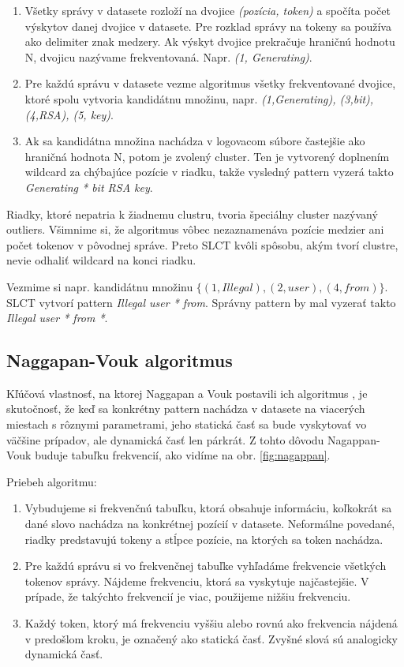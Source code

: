 \begin{enumerate}
  \item Všetky správy v datasete rozloží na dvojice \emph{(pozícia, token)} a spočíta počet výskytov danej dvojice v datasete. Pre rozklad správy na tokeny sa používa ako delimiter znak medzery. Ak výskyt dvojice prekračuje hraničnú hodnotu N, dvojicu nazývame frekventovaná. Napr. \emph{(1, Generating)}.
  \item Pre každú správu v datasete vezme algoritmus všetky frekventované dvojice, ktoré spolu vytvoria kandidátnu množinu, napr. \emph{{(1,Generating), (3,bit), (4,RSA), (5, key)}}. 
  \item Ak sa kandidátna množina nachádza v logovacom súbore častejšie ako hraničná hodnota N, potom je zvolený cluster. Ten je vytvorený doplnením wildcard za chýbajúce pozície v riadku, takže vysledný pattern vyzerá takto \emph{Generating * bit RSA key}.
\end{enumerate}

Riadky, ktoré nepatria k žiadnemu clustru, tvoria špeciálny cluster nazývaný outliers. Všimnime si, že algoritmus vôbec nezaznamenáva pozície medzier ani počet tokenov v pôvodnej správe. Preto SLCT kvôli spôsobu, akým tvorí clustre, nevie odhaliť wildcard na konci riadku. 
\par Vezmime si napr. kandidátnu množinu $\{(1,Illegal), (2,user), (4,from)\} $. SLCT vytvorí pattern \emph{Illegal user * from}. Správny pattern by mal vyzerať takto  \emph{Illegal user * from *}.

\subsection{Naggapan-Vouk algoritmus}
Kľúčová vlastnosť, na ktorej Naggapan a Vouk postavili ich algoritmus \parencite{nagappanvouk}, je skutočnosť, že keď sa konkrétny pattern nachádza v datasete na viacerých miestach s rôznymi parametrami, jeho statická časť sa bude vyskytovať vo väčšine prípadov, ale dynamická časť len párkrát. Z tohto dôvodu Nagappan-Vouk buduje tabuľku frekvencií, ako vidíme na obr. \ref{fig:nagappan}. 
\par Priebeh algoritmu:

\begin{enumerate}
  \item Vybudujeme si frekvenčnú tabuľku, ktorá obsahuje informáciu, koľkokrát sa dané slovo nachádza na konkrétnej pozícií v datasete. Neformálne povedané, riadky predstavujú tokeny a stĺpce pozície, na ktorých sa token nachádza.
  \item Pre každú správu si vo frekvenčnej tabuľke vyhľadáme frekvencie všetkých tokenov správy. Nájdeme frekvenciu, ktorá sa vyskytuje najčastejšie. V prípade, že takýchto frekvencií je viac, použijeme nižšiu frekvenciu.
  \item Každý token, ktorý má frekvenciu vyššiu alebo rovnú ako frekvencia nájdená v predošlom kroku, je označený ako statická časť. Zvyšné slová sú analogicky dynamická časť.
\end{enumerate}

